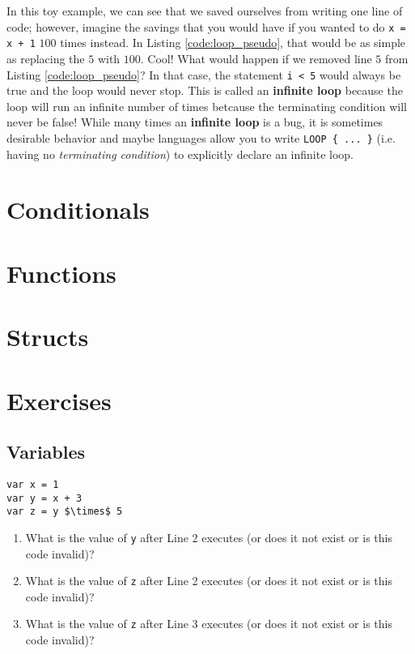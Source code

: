 \documentclass{article}
\begin{document}
In this toy example, we can see that we saved ourselves from writing one line of code; however, imagine the savings that you would have if you wanted to do \lstinline{x = x + 1} $100$ times instead.
In Listing \ref{code:loop_pseudo}, that would be as simple as replacing the $5$ with $100$.
Cool!
What would happen if we removed line $5$ from Listing \ref{code:loop_pseudo}?
In that case, the statement \lstinline{i < 5} would always be true and the loop would never stop.
This is called an \textbf{infinite loop} because the loop will run an infinite number of times betcause the terminating condition will never be false!
While many times an \textbf{infinite loop} is a bug, it is sometimes desirable behavior and maybe languages allow you to write \lstinline|LOOP { ... }| (i.e. having no \textit{terminating condition}) to explicitly declare an infinite loop.

\section{Conditionals}

\section{Functions}

\section{Structs}

\section{Exercises}

\subsection{Variables}

\begin{Exercise}

\begin{lstlisting}[caption={Pseudocode.}, label={code:exercise_var_1}, mathescape]
var x = 1
var y = x + 3
var z = y $\times$ 5
\end{lstlisting}

\begin{enumerate}
\item What is the value of \lstinline{y} after Line 2 executes (or does it not exist or is this code invalid)?
\item What is the value of \lstinline{z} after Line 2 executes (or does it not exist or is this code invalid)?
\item What is the value of \lstinline{z} after Line 3 executes (or does it not exist or is this code invalid)?
\end{enumerate}

\end{Exercise}
\end{document}
